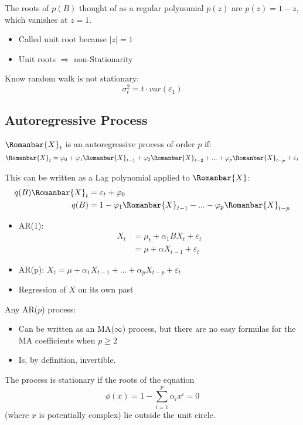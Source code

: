 The roots of $p(B)$ thought of as a regular polynomial $p(z)$ are $p(z)=1-z$, which vanishes at $z=1$.
\begin{itemize}
    \item Called unit root because $|z|=1$
    \item Unit roots $\Rightarrow$ non-Stationarity
\end{itemize}
 Know random walk is not stationary:
\[\sigma^2_t=t \cdot var(\varepsilon_1)\]

\subsection{Autoregressive Process}

$\Romanbar{X}_t$ is an autoregressive process of order $p$ if:
\[\Romanbar{X}_t=\varphi_0+\varphi_1\Romanbar{X}_{t-1}+\varphi_2\Romanbar{X}_{t-2}+...+\varphi_p\Romanbar{X}_{t-p}+\varepsilon_t\]

This can be written as a Lag polynomial applied to $\Romanbar{X}$:
\begin{align*}
    q(B)\Romanbar{X}_t&=\varepsilon_t+\varphi_0\\
    q(B)&=1-\varphi_1\Romanbar{X}_{t-1}-...-\varphi_p\Romanbar{X}_{t-p}
\end{align*}

\begin{itemize}
    \item AR(1):
    \begin{align*}
        X_t&=\mu_t+\alpha_1 BX_t +\varepsilon_t\\
        &=\mu+\alpha X_{t-1}+\varepsilon_t
    \end{align*}
    \item AR(p): $X_t=\mu+\alpha_1 X_{t-1}+...+\alpha_pX_{t-p}+\varepsilon_t $
    \item[] Regression of $X$ on its own past
\end{itemize}

Any AR($p$) process:
\begin{itemize}
    \item Can be written as an MA($\infty$) process, but there are no easy formulas for the MA coefficients when $p\geq 2$
    \item Is, by definition, invertible.
\end{itemize}

The process is stationary if the roots of the equation \[
\phi(x)=1-\sum_{i=1}^p \alpha_i x^{i} = 0
\] (where $x$ is potentially complex) lie outside the unit circle.\\

